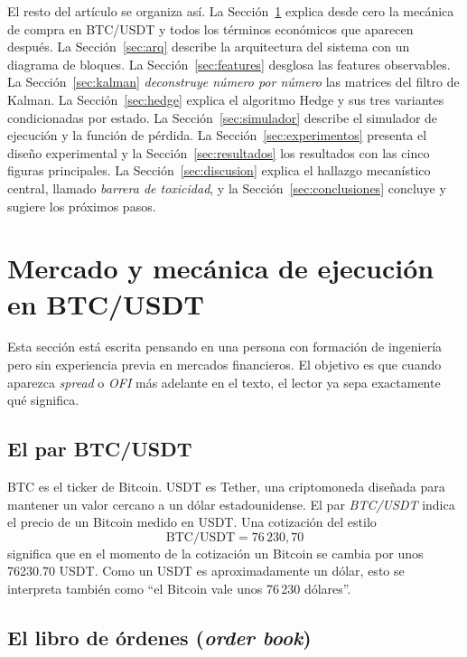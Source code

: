 \documentclass[journal,onecolumn,11pt]{IEEEtran}
\begin{document}
El resto del artículo se organiza así. La Sección~\ref{sec:mercado}
explica desde cero la mecánica de compra en BTC/USDT y todos los
términos económicos que aparecen después. La Sección~\ref{sec:arq}
describe la arquitectura del sistema con un diagrama de bloques.
La Sección~\ref{sec:features} desglosa las features observables.
La Sección~\ref{sec:kalman} \emph{deconstruye número por número} las
matrices del filtro de Kalman. La Sección~\ref{sec:hedge} explica el
algoritmo Hedge y sus tres variantes condicionadas por estado.
La Sección~\ref{sec:simulador} describe el simulador de ejecución y
la función de pérdida. La Sección~\ref{sec:experimentos} presenta el
diseño experimental y la Sección~\ref{sec:resultados} los resultados
con las cinco figuras principales. La Sección~\ref{sec:discusion}
explica el hallazgo mecanístico central, llamado \emph{barrera de
toxicidad}, y la Sección~\ref{sec:conclusiones} concluye y sugiere
los próximos pasos.

\section{Mercado y mecánica de ejecución en BTC/USDT}\label{sec:mercado}

Esta sección está escrita pensando en una persona con formación de
ingeniería pero sin experiencia previa en mercados financieros. El
objetivo es que cuando aparezca \emph{spread} o \emph{OFI} más
adelante en el texto, el lector ya sepa exactamente qué significa.

\subsection{El par BTC/USDT}
BTC es el ticker de Bitcoin. USDT es Tether, una criptomoneda diseñada
para mantener un valor cercano a un dólar estadounidense. El par
\emph{BTC/USDT} indica el precio de un Bitcoin medido en USDT.
Una cotización del estilo
\[
\text{BTC/USDT} = 76\,230{,}70
\]
significa que en el momento de la cotización un Bitcoin se cambia por
unos \num{76230,70} USDT. Como un USDT es aproximadamente un dólar,
esto se interpreta también como ``el Bitcoin vale unos 76\,230 dólares''.

\subsection{El libro de órdenes (\emph{order book})}
\end{document}
